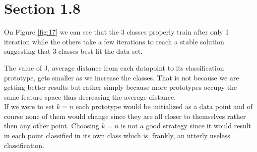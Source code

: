 \documentclass{article}
\begin{document}
\section*{Section 1.8}
On Figure \ref{fig:17} we can see that the 3 classes properly train after only 1 iteration while the others take a few iterations to reach a stable solution suggesting that 3 classes best fit the data set.

The value of J, average distance from each datapoint to its classification prototype, gets smaller as we increase the classes. That is not because we are getting better results but rather simply because more prototypes occupy the same feature space thus decreasing the average distance.\\

If we were to set $k=n$ each prototype would be initialized as a data point and of course none of them would change since they are all closer to themselves rather then any other point. Choosing $k=n$ is not a good strategy since it would result in each point classified in its own class which is, frankly, an utterly useless classification.
\end{document}
